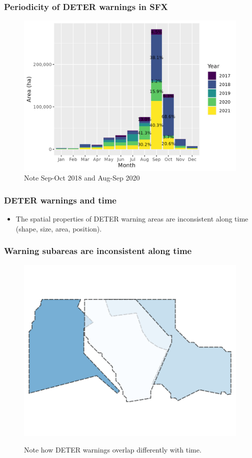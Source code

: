\documentclass[aspectratio=169]{beamer}
\begin{document}
\begin{frame}
    \frametitle{Periodicity of DETER warnings in SFX}
    \begin{figure}[h] 
        \includegraphics[width=0.65\linewidth]
        {./figures/deter_warnings_size_month.png}
        \caption{Note Sep-Oct 2018 and Aug-Sep 2020 }
        \label{fig:deter_warnings_periodicity}
    \end{figure}
\end{frame}

\begin{frame}
    \frametitle{DETER warnings and time}
    \begin{itemize}
        \item The spatial properties of DETER warning areas are inconsistent 
            along time (shape, size, area, position).
    \end{itemize}
\end{frame}

\begin{frame}
    \frametitle{Warning subareas are inconsistent along time}
    \begin{figure}[h] 
        \includegraphics[width=0.60\linewidth]
        {./figures/sample_deter_warnings.png}
        \label{fig:deter_subareas}
        \caption{Note how DETER warnings overlap differently with time.}
    \end{figure}
\end{frame}
\end{document}
